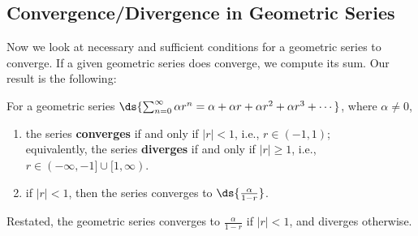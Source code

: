 \subsection{Convergence/Divergence in Geometric Series}
Now we look at necessary and sufficient conditions for a 
geometric series to converge.  If a given geometric
series does converge, we compute its sum.  Our result
is the following:

\begin{theorem}
For a geometric series $\ds{\sum_{n=0}^\infty \alpha r^n
   =\alpha+\alpha r+\alpha r^2+\alpha r^3+\cdots}$, where $\alpha\ne0$,
\begin{enumerate}
\item the series {\bf converges} if and only if $|r|<1$, i.e., $r\in(-1,1)$;\\
      equivalently, the series {\bf diverges} if and only if $|r|\ge 1$, i.e., 
      $r\in(-\infty,-1]\cup[1,\infty)$.
\item if $|r|<1$, then the series converges to $\ds{\frac{\alpha}{1-r}}$.
\end{enumerate}
\end{theorem}
Restated, the geometric series converges to $\frac{\alpha}{1-r}$ if $|r|<1$,
and diverges otherwise.

